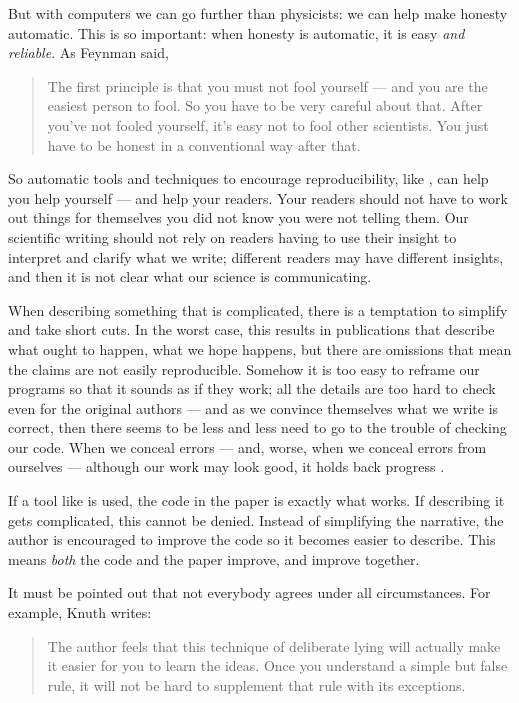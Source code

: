 \documentclass[prodmode,acmtecs]{acmsmall} %
\begin{document}
But with computers we can go further than physicists: we can help make honesty automatic. This is so important: when honesty is automatic, it is easy \emph{and reliable}. As Feynman said, 

\begin{quote}\startquote 
The first principle is that you must not fool yourself --- and you are the easiest person to fool.  So you have to be very careful about that.  After you've not fooled yourself, it's easy not to fool other scientists.  You just have to be honest in a conventional way after that.\quoteend
\end{quote}

So automatic tools and techniques to encourage reproducibility, like , can help you help yourself --- and help your readers. Your readers should not have to work out things for themselves you did not know you were not telling them. Our scientific writing should not rely on readers having to use their insight to interpret and clarify what we write; different readers may have different insights, and then it is not clear what our science is communicating.

When describing something that is complicated, there is a temptation to simplify and take short cuts. In the worst case, this results in publications that describe what ought to happen, what we hope happens, but there are omissions that mean the claims are not easily reproducible. Somehow it is too easy to reframe our programs so that it sounds as if they work; all the details are too hard to check even for the original authors --- and as we convince themselves what we write is correct, then there seems to be less and less need to go to the trouble of checking our code. When we conceal errors --- and, worse, when we conceal errors from ourselves --- although our work may look good, it holds back progress \cite{blackbox}.

If a tool like  is used, the code in the paper is exactly what works. If describing it gets complicated, this cannot be denied. Instead of simplifying the narrative, the author is encouraged to improve the code so it becomes easier to describe. This means \emph{both\/} the code and the paper improve, and improve together.

It must be pointed out that not everybody agrees under all circumstances. For example, Knuth writes:

\begin{quote}\startquote 
The author feels that this technique of deliberate lying will actually make it easier for you to learn the ideas. Once you understand a simple but false rule, it will not be hard to supplement that rule with its exceptions.\quoteend\hfill\cite[p\emph{vii}]{texbook}
\end{quote}
\end{document}
